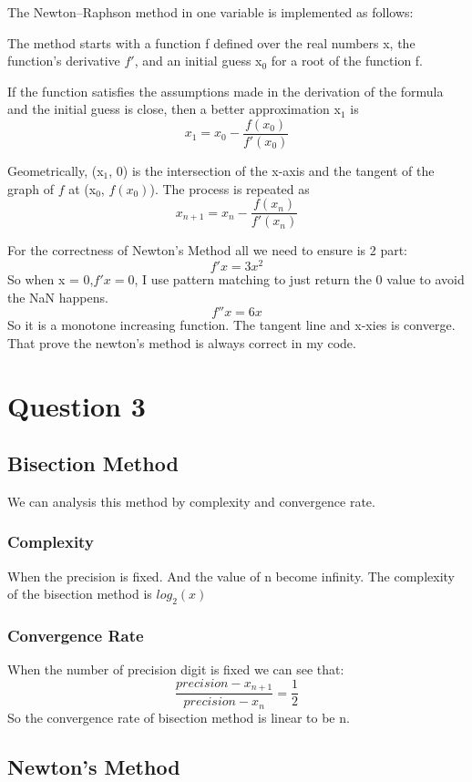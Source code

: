 \documentclass[setspace, doublespace]{scrartcl}
\begin{document}
The Newton–Raphson method in one variable is implemented as follows:

The method starts with a function f defined over the real numbers x, the
function's derivative \(f′\), and an initial guess x\(_{\text{0}}\) for a root of the
function f.

If the function satisfies the assumptions made in the derivation of the formula
and the initial guess is close, then a better approximation x\(_{\text{1}}\) is
$$ x_1 = x_0 - \frac{f(x_0)}{f'(x_0)} $$

Geometrically, (x\(_{\text{1}}\), 0) is the intersection of the x-axis and the tangent of
the graph of \(f\) at (x\(_{\text{0}}\), \(f (x_0)\)).
The process is repeated as
$$ x_{n+1} = x_n - \frac{f(x_n)}{f'(x_n)} $$

For the correctness of Newton's Method all we need to ensure is 2 part:
$$ f'x = 3x^2$$
So when x = 0,\(f'x = 0\), I use pattern matching to just return the 0 value to avoid the
NaN happens.
$$ f''x = 6x $$
So it is a monotone increasing function. The tangent line and x-xies is
converge.
That prove the newton's method is always correct in my code.

\section{Question 3}
\label{sec:org6f0c2e1}
\subsection{Bisection Method}
\label{sec:org7073cc9}
We can analysis this method by complexity and convergence rate.
\subsubsection{Complexity}
\label{sec:org35617c2}
When the precision is fixed. And the value of n become infinity. The
complexity of the bisection method is \(log_2(x)\)
\subsubsection{Convergence Rate}
\label{sec:orgd3e6cc2}
When the number of precision digit is fixed we can see that:
$$ \frac{precision - x_{n+1}}{precision - x_{n}} = \frac{1}{2} $$
So the convergence rate of bisection method is linear to be n.

\subsection{Newton's Method}
\label{sec:orgf5f5c23}
\end{document}
